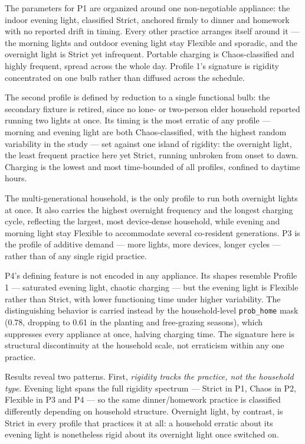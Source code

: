 \documentclass[final,3p,times,onecolumn]{elsarticle}
\begin{document}
The parameters for P1 are organized around one non-negotiable appliance: the indoor evening light, classified Strict, anchored firmly to dinner and homework with no reported drift in timing. Every other practice arranges itself around it --- the morning lights and outdoor evening light stay Flexible and sporadic, and the overnight light is Strict yet infrequent. Portable charging is Chaos-classified and highly frequent, spread across the whole day. Profile 1's signature is rigidity concentrated on one bulb rather than diffused across the schedule.

The second profile is defined by reduction to a single functional bulb: the secondary fixture is retired, since no lone- or two-person elder household reported running two lights at once. Its timing is the most erratic of any profile --- morning and evening light are both Chaos-classified, with the highest random variability in the study --- set against one island of rigidity: the overnight light, the least frequent practice here yet Strict, running unbroken from onset to dawn. Charging is the lowest and most time-bounded of all profiles, confined to daytime hours.

The multi-generational household, is the only profile to run both overnight lights at once. It also carries the highest overnight frequency and the longest charging cycle, reflecting the largest, most device-dense household, while evening and morning light stay Flexible to accommodate several co-resident generations. P3 is the profile of additive demand --- more lights, more devices, longer cycles --- rather than of any single rigid practice.

P4's defining feature is not encoded in any appliance. Its shapes resemble Profile 1 --- saturated evening light, chaotic charging --- but the evening light is Flexible rather than Strict, with lower functioning time under higher variability. The distinguishing behavior is carried instead by the household-level \texttt{prob\_home} mask (0.78, dropping to 0.61 in the planting and free-grazing seasons), which suppresses every appliance at once, halving charging time. The signature here is structural discontinuity at the household scale, not erraticism within any one practice.

Results reveal two patterns. First, \emph{rigidity tracks the practice, not the household type}. Evening light spans the full rigidity spectrum --- Strict in P1, Chaos in P2, Flexible in P3 and P4 --- so the same dinner/homework practice is classified differently depending on household structure. Overnight light, by contrast, is Strict in every profile that practices it at all: a household erratic about its evening light is nonetheless rigid about its overnight light once switched on.
\end{document}
